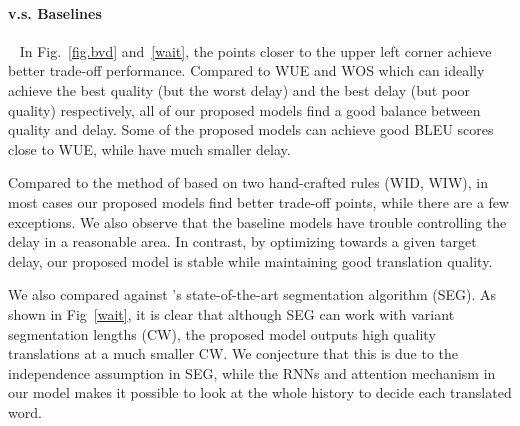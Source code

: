 \paragraph{v.s. Baselines}~
In Fig.~\ref{fig.bvd} and~\ref{wait}, %
the points closer to the upper left corner achieve better trade-off performance. 
Compared to WUE and WOS which can ideally achieve the best quality (but the worst delay) and the best delay (but poor quality) respectively, all of our proposed models find a good balance between quality and delay.  Some of the proposed models can achieve good BLEU scores close to WUE, while have much smaller delay.


Compared to the method of \citep{cho2016can} based on two hand-crafted rules (WID, WIW), in most cases our proposed models find better trade-off points, while there are a few exceptions. We also observe that the baseline models have trouble controlling the delay in a reasonable area. In contrast, by optimizing towards a given target delay, our proposed model is stable while maintaining good translation quality.
  
We also compared against \citep{oda-EtAl:2014:P14-2}'s state-of-the-art segmentation algorithm (SEG). As shown in Fig~\ref{wait}, it is clear that although SEG can work with variant segmentation lengths (CW), 
the proposed model outputs high quality translations at a much smaller CW. 
We conjecture that this is due to the independence assumption in SEG,
while the RNNs and attention mechanism in our model makes it possible to look at the whole history to decide each translated word.

